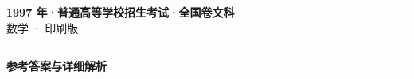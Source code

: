 \documentclass[zihao=5, a4paper]{ctexart}
\begin{document}
\begin{center}
  {\Large\bfseries 1997 年·普通高等学校招生考试·全国卷文科}\\[4pt]
  {\large 数学 · 印刷版}
\end{center}
\medskip
{}

\par\bigskip\hrule\bigskip
{}
\begin{center}{\large\bfseries 参考答案与详细解析}\end{center}
\smallskip

\end{document}
